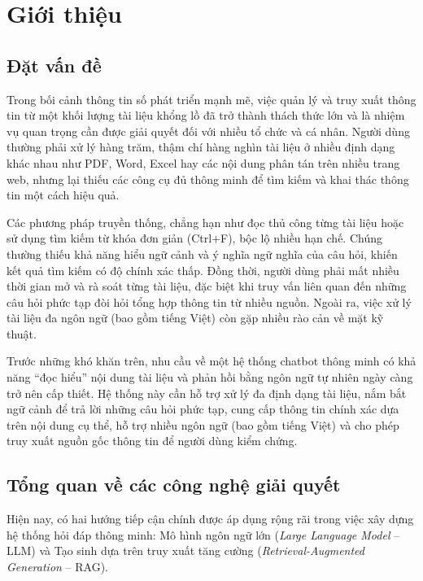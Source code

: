 \renewcommand{\chaptername}{Phần}
\renewcommand{\figurename}{Hình}

\chapter{Giới thiệu}

\section{Đặt vấn đề}

Trong bối cảnh thông tin số phát triển mạnh mẽ, việc quản lý và truy xuất thông tin từ một khối lượng tài liệu khổng lồ đã trở thành thách thức lớn và là nhiệm vụ quan trọng cần được giải quyết đối với nhiều tổ chức và cá nhân. Người dùng thường phải xử lý hàng trăm, thậm chí hàng nghìn tài liệu ở nhiều định dạng khác nhau như PDF, Word, Excel hay các nội dung phân tán trên nhiều trang web, nhưng lại thiếu các công cụ đủ thông minh để tìm kiếm và khai thác thông tin một cách hiệu quả.

Các phương pháp truyền thống, chẳng hạn như đọc thủ công từng tài liệu hoặc sử dụng tìm kiếm từ khóa đơn giản (Ctrl+F), bộc lộ nhiều hạn chế. Chúng thường thiếu khả năng hiểu ngữ cảnh và ý nghĩa ngữ nghĩa của câu hỏi, khiến kết quả tìm kiếm có độ chính xác thấp. Đồng thời, người dùng phải mất nhiều thời gian mở và rà soát từng tài liệu, đặc biệt khi truy vấn liên quan đến những câu hỏi phức tạp đòi hỏi tổng hợp thông tin từ nhiều nguồn. Ngoài ra, việc xử lý tài liệu đa ngôn ngữ (bao gồm tiếng Việt) còn gặp nhiều rào cản về mặt kỹ thuật.

Trước những khó khăn trên, nhu cầu về một hệ thống chatbot thông minh có khả năng “đọc hiểu” nội dung tài liệu và phản hồi bằng ngôn ngữ tự nhiên ngày càng trở nên cấp thiết. Hệ thống này cần hỗ trợ xử lý đa định dạng tài liệu, nắm bắt ngữ cảnh để trả lời những câu hỏi phức tạp, cung cấp thông tin chính xác dựa trên nội dung cụ thể, hỗ trợ nhiều ngôn ngữ (bao gồm tiếng Việt) và cho phép truy xuất nguồn gốc thông tin để người dùng kiểm chứng.

\section{Tổng quan về các công nghệ giải quyết}

Hiện nay, có hai hướng tiếp cận chính được áp dụng rộng rãi trong việc xây dựng hệ thống hỏi đáp thông minh: {Mô hình ngôn ngữ lớn} (\emph{Large Language Model} -- LLM) và {Tạo sinh dựa trên truy xuất tăng cường} (\emph{Retrieval-Augmented Generation} -- RAG).

